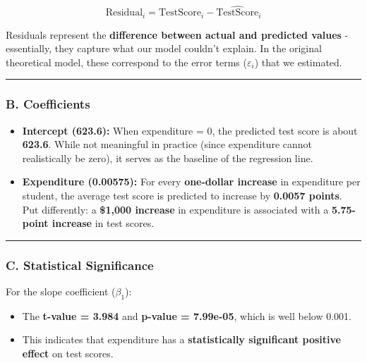 \documentclass[
  12pt,
  letterpaper,
]{scrbook}
\providecommand{\tightlist}{%
  \setlength{\itemsep}{0pt}\setlength{\parskip}{0pt}}
\renewcommand{\tightlist}{\setlength{\itemsep}{0.5\baselineskip}\setlength{\parskip}{0.2\baselineskip}}
\theoremstyle{definition}
\theoremstyle{plain}
\theoremstyle{remark}
\begin{document}
\[
\text{Residual}_i = \text{TestScore}_i - \widehat{\text{TestScore}}_i
\]

Residuals represent the \textbf{difference between actual and predicted
values} - essentially, they capture what our model couldn't explain. In
the original theoretical model, these correspond to the error terms
(\(\varepsilon_i\)) that we estimated.

\begin{center}\rule{0.5\linewidth}{0.5pt}\end{center}

\subsubsection{\texorpdfstring{B.
\textbf{Coefficients}}{B. Coefficients}}\label{b.-coefficients}

\begin{itemize}
\item
  \textbf{Intercept (623.6):} When expenditure = 0, the predicted test
  score is about \textbf{623.6}. While not meaningful in practice (since
  expenditure cannot realistically be zero), it serves as the baseline
  of the regression line.
\item
  \textbf{Expenditure (0.00575):} For every \textbf{one-dollar increase}
  in expenditure per student, the average test score is predicted to
  increase by \textbf{0.0057 points}. Put differently: a \textbf{\$1,000
  increase} in expenditure is associated with a \textbf{5.75-point
  increase} in test scores.
\end{itemize}

\begin{center}\rule{0.5\linewidth}{0.5pt}\end{center}

\subsubsection{\texorpdfstring{C. \textbf{Statistical
Significance}}{C. Statistical Significance}}\label{c.-statistical-significance}

For the slope coefficient (\(\beta_1\)):

\begin{itemize}
\tightlist
\item
  The \textbf{t-value = 3.984} and \textbf{p-value = 7.99e-05}, which is
  well below 0.001.
\item
  This indicates that expenditure has a \textbf{statistically
  significant positive effect} on test scores.
\end{itemize}
\end{document}
